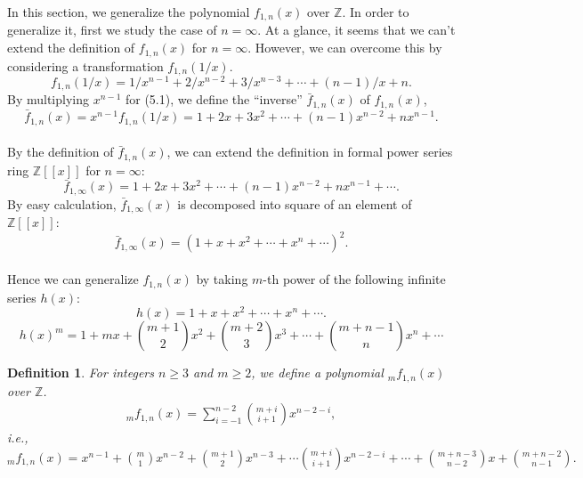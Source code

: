 \documentclass{article}
\newtheorem{defi}{Definition}[section]
\begin{document}
In this section, we generalize the polynomial $f_{1,n}(x)$ over $\mathbb{Z}$. In order to generalize it, first we study the case of $n=\infty$.
At a glance, it seems that we can't extend the definition of $f_{1,n}(x)$ for $n=\infty$. However, we can overcome this by considering a transformation $f_{1,n}(1/x)$.
\begin{equation}
f_{1,n}(1/x)=1/x^{n-1}+2/x^{n-2}+3/x^{n-3}+\cdots +(n-1)/x+n.
\end{equation}
By multiplying $x^{n-1}$ for (5.1), we define the ``inverse'' $\bar{f}_{1,n}(x)$ of $f_{1,n}(x)$,
\begin{equation}
\bar{f}_{1,n}(x)= x^{n-1}f_{1,n}(1/x)=1+2x+3x^{2}+\cdots +(n-1)x^{n-2}+nx^{n-1}.
\end{equation}
\\
By the definition of $\bar{f}_{1,n}(x)$, we can extend the definition in formal power series ring $\mathbb{Z}[[x]]$ for $n=\infty$:
\begin{equation}
\bar{f}_{1,\infty}(x)=1+2x+3x^{2}+\cdots +(n-1)x^{n-2}+nx^{n-1}+\cdots.
\end{equation}
By easy calculation, $\bar{f}_{1,\infty}(x)$ is decomposed into square of an element of $\mathbb{Z}[[x]]$:
\begin{equation}
\bar{f}_{1,\infty}(x)=(1+x+x^{2}+\cdots +x^{n}+\cdots)^{2}.
\end{equation}
\\
Hence we can generalize $f_{1,n}(x)$ by taking $m$-th power of the following infinite series $h(x)$:
\begin{equation}
h(x)=1+x+x^{2}+\cdots +x^{n}+\cdots.
\end{equation}
\begin{equation}
h(x)^{m} = 1+ mx + \binom{m+1}{2}x^{2} + \binom{m+2}{3}x^{3} + \cdots + \binom{m+n-1}{n}x^{n} + \cdots
\end{equation}

\begin{defi}
\upshape
For integers $n\geq 3$ and $m\geq 2$, we define a polynomial $_{m}f_{1,n}(x)$ over $\mathbb{Z}$.
\begin{eqnarray}
_{m}f_{1,n}(x) = \sum^{n-2}_{i=-1}\binom{m+i}{i+1}x^{n-2-i},
\end{eqnarray}
i.e., $_{m}f_{1,n}(x) = x^{n-1} + \binom{m}{1}x^{n-2} + \binom{m+1}{2}x^{n-3} + \cdots \binom{m+i}{i+1}x^{n-2-i} + \cdots + \binom{m+n-3}{n-2}x + \binom{m+n-2}{n-1}.$
\end{defi}
\end{document}
